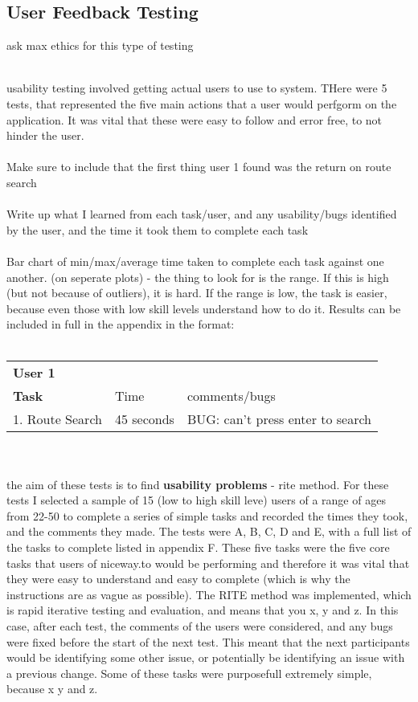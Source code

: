 \subsection{User Feedback Testing}
{\color{red} ask max ethics for this type of testing}\ \\
\ \\
{\color{cyan} 
usability testing involved getting actual users to use to system. THere were 5 tests, that represented the five main actions that a user would perfgorm on the application. It was vital that these were easy to follow and error free, to not hinder the user. \ \\
\ \\
Make sure to include that the first thing user 1 found was the return on route search\ \\
\ \\
Write up what I learned from each task/user, and any usability/bugs identified by the user, and the time it took them to complete each task\ \\
\ \\
Bar chart of min/max/average time taken to complete each task against one another. (on seperate plots) - the thing to look for is the range. If this is high (but not because of outliers), it is hard. If the range is low, the task is easier, because even those with low skill levels understand how to do it. Results can be included in full in the appendix in the format:\ \\
\ \\
\begin{tabular}{lll}
\textbf{User 1}  & & \\
\textbf{Task}  & Time & comments/bugs \\
1. Route Search & 45 seconds& BUG: can't press enter to search\\
\end{tabular}
\ \\
\ \\
the aim of these tests is to find \textbf{usability problems} - rite method. 
For these tests I selected a sample of 15 (low to high skill leve) users of a range of ages from 22-50 to complete a series of simple tasks and recorded the times they took, and the comments they made. The tests were A, B, C, D and E, with a full list of the tasks to complete listed in appendix F. These five tasks were the five core tasks that users of niceway.to would be performing and therefore it was vital that they were easy to understand and easy to complete (which is why the instructions are as vague as possible). The RITE method was implemented, which is rapid iterative testing and evaluation, and means that you x, y and z. In this case, after each test, the comments of the users were considered, and any bugs were fixed before the start of the next test. This meant that the next participants would be identifying some other issue, or potentially be identifying an issue with a previous change. Some of these tasks were purposefull extremely simple, because x y and z.
}

